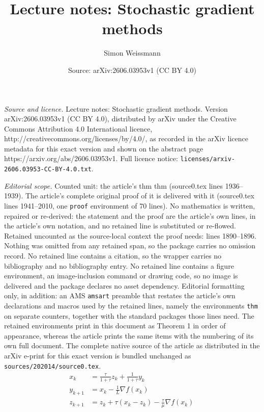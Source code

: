 \documentclass[10pt,a4paper]{amsart}
\title{Lecture notes: Stochastic gradient methods}
\author{Simon Weissmann}
\date{Source: arXiv:2606.03953v1 (CC BY 4.0)}
\begin{document}
\maketitle

\noindent\emph{Source and licence.} Lecture notes: Stochastic gradient methods. Version arXiv:2606.03953v1 (CC BY 4.0), distributed by arXiv under the Creative Commons Attribution 4.0 International licence, http://creativecommons.org/licenses/by/4.0/, as recorded in the arXiv licence metadata for this exact version and shown on the abstract page https://arxiv.org/abs/2606.03953v1. Full licence notice: \texttt{licenses/arxiv-2606.03953-CC-BY-4.0.txt}.\par\smallskip

\noindent\textit{Editorial scope.} Counted unit: the article's thm thm (source0.tex lines 1936--1939). The article's complete original proof of it is delivered with it (source0.tex lines 1941--2010, one \texttt{proof} environment of 70 lines). No mathematics is written, repaired or re-derived: the statement and the proof are the article's own lines, in the article's own notation, and no retained line is substituted or re-flowed.  Retained uncounted as the source-local context the proof needs: lines 1890--1896.  Nothing was omitted from any retained span, so the package carries no omission record.  No retained line contains a citation, so the wrapper carries no bibliography and no bibliography entry.  No retained line contains a figure environment, an image-inclusion command or drawing code, so no image is delivered and the package declares no asset dependency.  Editorial formatting only, in addition: an AMS \texttt{amsart} preamble that restates the article's own declarations and macros used by the retained lines, namely the environments \texttt{thm} on separate counters, together with the standard packages those lines need.  The retained environments print in this document as Theorem 1 in order of appearance, whereas the article prints the same items with the numbering of its own full document.  The complete native source of the article as distributed in the arXiv e-print for this exact version is bundled unchanged as \texttt{sources/202014/source0.tex}.
\begin{equation}\label{eq:NAM_strongconvex}
\begin{split}
x_k &= \frac{\tau}{1+\tau} z_k + \frac{1}{1+\tau} y_k\\
y_{k+1} &= x_k - \frac{1}{L}\nabla f(x_k)\\
z_{k+1} &= z_k +\tau(x_k-z_k)-\frac{\tau}{\mu}\nabla f(x_k)
\end{split}\, 
\end{equation}
\end{document}
